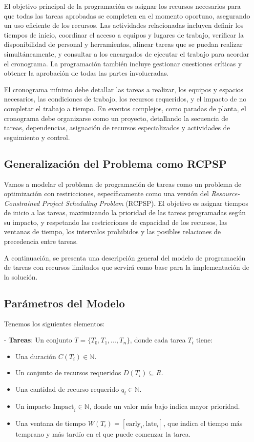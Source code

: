 \documentclass{article}
\begin{document}
El objetivo principal de la programación es asignar los recursos necesarios para que todas las tareas aprobadas se completen en el momento oportuno, asegurando un uso eficiente de los recursos. Las actividades relacionadas incluyen definir los tiempos de inicio, coordinar el acceso a equipos y lugares de trabajo, verificar la disponibilidad de personal y herramientas, alinear tareas que se puedan realizar simultáneamente, y consultar a los encargados de ejecutar el trabajo para acordar el cronograma. La programación también incluye gestionar cuestiones críticas y obtener la aprobación de todas las partes involucradas.

El cronograma mínimo debe detallar las tareas a realizar, los equipos y espacios necesarios, las condiciones de trabajo, los recursos requeridos, y el impacto de no completar el trabajo a tiempo. En eventos complejos, como paradas de planta, el cronograma debe organizarse como un proyecto, detallando la secuencia de tareas, dependencias, asignación de recursos especializados y actividades de seguimiento y control.

\subsection{Generalización del Problema como RCPSP}

Vamos a modelar el problema de programación de tareas como un problema de optimización con restricciones, específicamente como una versión del \textit{Resource-Constrained Project Scheduling Problem} (RCPSP). El objetivo es asignar tiempos de inicio a las tareas, maximizando la prioridad de las tareas programadas según su impacto, y respetando las restricciones de capacidad de los recursos, las ventanas de tiempo, los intervalos prohibidos y las posibles relaciones de precedencia entre tareas.

A continuación, se presenta una descripción general del modelo de programación de tareas con recursos limitados que servirá como base para la implementación de la solución.

\subsection*{Parámetros del Modelo}

Tenemos los siguientes elementos:

- \textbf{Tareas}: Un conjunto \( T = \{T_0, T_1, \dots, T_n\} \), donde cada tarea \( T_i \) tiene:
  \begin{itemize}
    \item Una duración \( C(T_i) \in \mathbb{N} \).
    \item Un conjunto de recursos requeridos \( D(T_i) \subseteq R \).
    \item Una cantidad de recurso requerido \( q_i \in \mathbb{N} \).
    \item Un impacto \( \text{Impact}_i \in \mathbb{N} \), donde un valor más bajo indica mayor prioridad.
    \item Una ventana de tiempo \( W(T_i) = [\text{early}_i, \text{late}_i] \), que indica el tiempo más temprano y más tardío en el que puede comenzar la tarea.
  \end{itemize}
\end{document}
